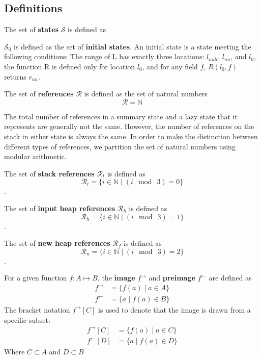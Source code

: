 \subsection{Definitions}

\begin{definition}
\label{def:state}
The set of \textbf{states} $\mathcal{S}$ is defined as
\end{definition}

\begin{definition}
\label{def:initstate}
$\mathcal{S}_0$ is defined as the set of \textbf{initial states}. An initial state is a state meeting the following conditions:  The range of L has exactly three locations: $l_{null}$, $l_{un}$, and $l_0$, the function R is defined only for location $l_0$, and for any field $f$, $R(l_0,f)$ returns $r_{un}$. 
\end{definition}

\begin{definition}
The set of \textbf{references} $\mathcal{R}$ is defined as the set of natural numbers
 $$\mathcal{R} = \mathbb{N}$$
\end{definition}

The total number of references in a summary state and a lazy state that it represents are generally not the same. However, the number of references on the stack in either state is always the same. In order to make the distinction between different types of references, we partition the set of natural numbers using modular arithmetic.

\begin{definition}
The set of \textbf{stack references} $\mathcal{R}_t$ is defined as
 $$\mathcal{R}_t =\{i \in \mathbb{N} \mid ( i\ \bmod\ 3 ) = 0\}$$. 
\end{definition}

\begin{definition}
The set of \textbf{input heap references} $\mathcal{R}_h$ is defined as
 $$\mathcal{R}_h =\{i \in \mathbb{N} \mid ( i\ \bmod\ 3 ) = 1\}$$. 
\end{definition}

\begin{definition}
The set of \textbf{new heap references} $\mathcal{R}_f$ is defined as
 $$\mathcal{R}_n =\{i \in \mathbb{N} \mid ( i\ \bmod\ 3 ) = 2\}$$. 
\end{definition}

\begin{definition}
For a given function $f:A \mapsto B$, the \textbf{image} $f^\rightarrow$ and \textbf{preimage} $f^\leftarrow$ are defined as
\begin{align}
 f^\rightarrow &= \{ f(a) \mid a \in A\}\\
 f^\leftarrow &= \{ a \mid f(a) \in B \}
 \end{align}
 The bracket notation $ f^\rightarrow [C] $ is used to denote that the image is drawn from a specific subset:
 \begin{align}
 f^\rightarrow [C] &= \{ f(a) \mid a \in C\}\\
 f^\leftarrow [D] &= \{ a \mid f(a) \in D \}
 \end{align}
 Where $C \subset A$ and $D \subset B$
\end{definition}

